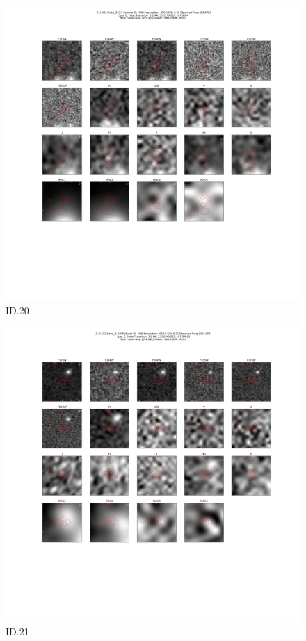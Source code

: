 \begin{figure}[tbp]
\centering \includegraphics[width=120mm]{Matched/ASPECS_Cutout_20.png}
\caption{ID.20}
\label{fig:Match_Three}
\end{figure}

\begin{figure}[tbp]
\centering \includegraphics[width=120mm]{Matched/ASPECS_Cutout_21.png}
\caption{ID.21}
\label{fig:Match_Three}
\end{figure}

